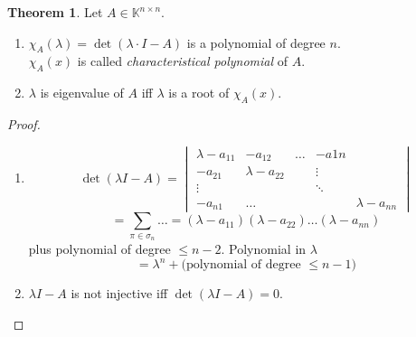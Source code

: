 \documentclass[a4paper,landscape,twocolumn]{article}
\theoremstyle{definition}
\newtheorem{theorem}{Theorem}
\begin{document}
\begin{theorem}
  \label{lemma-10.10}
  Let $A \in \mathbb K^{n \times n}$.
  \begin{enumerate}
    \item $\chi_A(\lambda) = \det(\lambda \cdot I - A)$ is a polynomial of degree $n$. \\
      $\chi_A(x)$ is called \emph{characteristical polynomial} of $A$.
    \item $\lambda$ is eigenvalue of $A$ iff $\lambda$ is a root of $\chi_A(x)$.
  \end{enumerate}
\end{theorem}
\begin{proof}
  \begin{enumerate}
    \item
      \[
        \det(\lambda I - A) = \begin{vmatrix}
          \lambda - a_{11} & -a_{12} & \ldots & -a{1n} \\
          -a_{21} & \lambda - a_{22} &        & \vdots \\
          \vdots  &        &         & \ddots & \\
          -a_{n1} & \ldots &         &        & \lambda - a_{nn}
        \end{vmatrix}
      \] \[
        = \sum_{\pi \in \sigma_n} \dots = (\lambda - a_{11})(\lambda - a_{22}) \ldots (\lambda - a_{nn})
      \]
      plus polynomial of degree $\leq n-2$.
      Polynomial in $\lambda$
      \[ = \lambda^n + \text{(polynomial of degree $\leq n-1$)} \]
    \item
      $\lambda I - A$ is not injective iff $\det(\lambda I - A) = 0$.
  \end{enumerate}
\end{proof}
\end{document}
